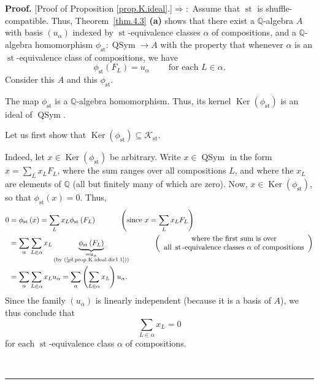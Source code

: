 \documentclass[numbers=enddot,12pt,final,onecolumn,notitlepage]{scrartcl}%
\theoremstyle{definition}
\newenvironment{proof}[1][Proof]{\noindent\textbf{#1.} }{\ \rule{0.5em}{0.5em}}
\let\sumnonlimits\sum
\renewcommand{\sum}{\sumnonlimits\limits}
\begin{document}
\begin{proof}
[Proof of Proposition \ref{prop.K.ideal}.]$\Longrightarrow:$ Assume that
$\operatorname*{st}$ is shuffle-compatible. Thus, Theorem~\ref{thm.4.3}
\textbf{(a)} shows that there exist a $\mathbb{Q}$-algebra $A$ with basis
$\left(  u_{\alpha}\right)  $ indexed by $\operatorname*{st}$-equivalence
classes $\alpha$ of compositions, and a $\mathbb{Q}$-algebra homomorphism
$\phi_{\operatorname*{st}}:\operatorname*{QSym}\rightarrow A$ with the
property that whenever $\alpha$ is an $\operatorname*{st}$-equivalence class
of compositions, we have%
\begin{equation}
\phi_{\operatorname*{st}}\left(  F_{L}\right)  =u_{\alpha}%
\ \ \ \ \ \ \ \ \ \ \text{for each }L\in\alpha. \label{pf.prop.K.ideal.dir1.1}%
\end{equation}
Consider this $A$ and this $\phi_{\operatorname*{st}}$.

The map $\phi_{\operatorname*{st}}$ is a $\mathbb{Q}$-algebra homomorphism.
Thus, its kernel $\operatorname*{Ker}\left(  \phi_{\operatorname*{st}}\right)
$ is an ideal of $\operatorname*{QSym}$.

Let us first show that $\operatorname*{Ker}\left(  \phi_{\operatorname*{st}%
}\right)  \subseteq\mathcal{K}_{\operatorname*{st}}$.

Indeed, let $x\in\operatorname*{Ker}\left(  \phi_{\operatorname*{st}}\right)
$ be arbitrary. Write $x\in\operatorname*{QSym}$ in the form $x=\sum_{L}%
x_{L}F_{L}$, where the sum ranges over all compositions $L$, and where the
$x_{L}$ are elements of $\mathbb{Q}$ (all but finitely many of which are
zero). Now, $x\in\operatorname*{Ker}\left(  \phi_{\operatorname*{st}}\right)
$, so that $\phi_{\operatorname*{st}}\left(  x\right)  =0$. Thus,%
\begin{align*}
0  &  =\phi_{\operatorname*{st}}\left(  x\right)  =\sum_{L}x_{L}%
\phi_{\operatorname*{st}}\left(  F_{L}\right)  \ \ \ \ \ \ \ \ \ \ \left(
\text{since }x=\sum_{L}x_{L}F_{L}\right) \\
&  =\sum_{\alpha}\sum_{L\in\alpha}x_{L}\underbrace{\phi_{\operatorname*{st}%
}\left(  F_{L}\right)  }_{\substack{=u_{\alpha}\\\text{(by
(\ref{pf.prop.K.ideal.dir1.1}))}}}\ \ \ \ \ \ \ \ \ \ \left(
\begin{array}
[c]{c}%
\text{where the first sum is over}\\
\text{all }\operatorname*{st}\text{-equivalence classes }\alpha\text{ of
compositions}%
\end{array}
\right) \\
&  =\sum_{\alpha}\sum_{L\in\alpha}x_{L}u_{\alpha}=\sum_{\alpha}\left(
\sum_{L\in\alpha}x_{L}\right)  u_{\alpha}.
\end{align*}
Since the family $\left(  u_{\alpha}\right)  $ is linearly independent
(because it is a basis of $A$), we thus conclude that
\begin{equation}
\sum_{L\in\alpha}x_{L}=0 \label{pf.prop.K.ideal.dir1.2}%
\end{equation}
for each $\operatorname*{st}$-equivalence class $\alpha$ of compositions.


\end{proof}
\end{document}
